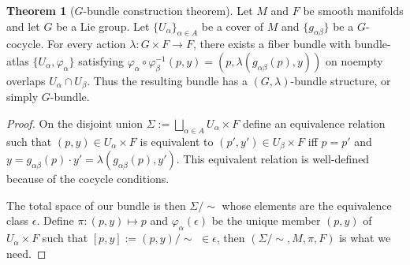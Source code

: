 \documentclass[11pt]{article}
\theoremstyle{definition}
\newtheorem{thm}[para]{Theorem}
\begin{document}
\begin{thm}[$G$-bundle construction theorem]
	Let $M$ and $F$ be smooth manifolds and let $G$ be a Lie group. Let $\{U_\alpha\}_{\alpha\in A}$ be a cover of $M$ and $\{g_{\alpha\beta}\}$ be a $G$-cocycle. For {\color{blue}every} action $\lambda:G\times F\to F$, there exists a fiber bundle with bundle-atlas $\{U_\alpha,\varphi_\alpha\}$ satisfying $\varphi_\alpha\circ \varphi_\beta^{-1}(p,y)=(p,\lambda(g_{\alpha\beta}(p),y))$ on noempty overlaps $U_\alpha\cap U_\beta$. Thus the resulting bundle has a $(G,\lambda)$-bundle structure, or simply $G$-bundle.
\end{thm}

\begin{proof}
	On the disjoint union $\Sigma:=\bigsqcup_{\alpha\in A}U_\alpha\times F$ define an equivalence relation such that $(p,y)\in U_\alpha\times F$ is equivalent to $(p',y')\in U_\beta\times F$ iff $p=p'$ and $y=g_{\alpha\beta}(p)\cdot y'=\lambda(g_{\alpha\beta}(p),y')$. This equivalent relation is well-defined because of the cocycle conditions. 
	
	The total space of our bundle is then $\Sigma/\!\!\sim$ whose elements are the equivalence class $\epsilon$. Define $\pi:(p,y)\mapsto p$ and $\varphi_\alpha(\epsilon)$ be the unique member $(p,y)$ of $U_\alpha\times F$ such that $[p,y]:=(p,y)/\!\!\sim\,\,\in \epsilon$, then $(\Sigma/\!\!\sim,M,\pi,F)$ is what we need.
\end{proof}
\end{document}
